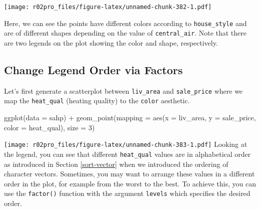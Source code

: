 \documentclass[
]{book}
\newenvironment{Shaded}{\begin{snugshade}}{\end{snugshade}}
\newcommand{\AttributeTok}[1]{\textcolor[rgb]{0.77,0.63,0.00}{#1}}
\newcommand{\DecValTok}[1]{\textcolor[rgb]{0.00,0.00,0.81}{#1}}
\newcommand{\FunctionTok}[1]{\textcolor[rgb]{0.00,0.00,0.00}{#1}}
\newcommand{\NormalTok}[1]{#1}
\newcommand{\OtherTok}[1]{\textcolor[rgb]{0.56,0.35,0.01}{#1}}
\newcommand{\SpecialCharTok}[1]{\textcolor[rgb]{0.00,0.00,0.00}{#1}}
\newcommand{\StringTok}[1]{\textcolor[rgb]{0.31,0.60,0.02}{#1}}
\begin{document}
\texttt{[image: r02pro\_files/figure-latex/unnamed-chunk-382-1.pdf]}

Here, we can see the points have different colors according to \texttt{house\_style} and are of different shapes depending on the value of \texttt{central\_air}. Note that there are two legends on the plot showing the color and shape, respectively.

\hypertarget{change-legend-order-via-factors}{%
\subsection{Change Legend Order via Factors}\label{change-legend-order-via-factors}}

Let's first generate a scatterplot between \texttt{liv\_area} and \texttt{sale\_price} where we map the \texttt{heat\_qual} (heating quality) to the \texttt{color} aesthetic.

\begin{Shaded}
\begin{Highlighting}[]
\FunctionTok{ggplot}\NormalTok{(}\AttributeTok{data =}\NormalTok{ sahp) }\SpecialCharTok{+} \FunctionTok{geom\_point}\NormalTok{(}\AttributeTok{mapping =} \FunctionTok{aes}\NormalTok{(}\AttributeTok{x =}\NormalTok{ liv\_area, }\AttributeTok{y =}\NormalTok{ sale\_price, }\AttributeTok{color =}\NormalTok{ heat\_qual), }\AttributeTok{size =} \DecValTok{3}\NormalTok{)}
\end{Highlighting}
\end{Shaded}

\texttt{[image: r02pro\_files/figure-latex/unnamed-chunk-383-1.pdf]}
Looking at the legend, you can see that different \texttt{heat\_qual} values are in alphabetical order as introduced in Section \ref{sort-vector} when we introduced the ordering of character vectors. Sometimes, you may want to arrange these values in a different order in the plot, for example from the worst to the best. To achieve this, you can use the \texttt{factor()} function with the argument \texttt{levels} which specifies the desired order.

\begin{Shaded}
\end{Shaded}
\end{document}
